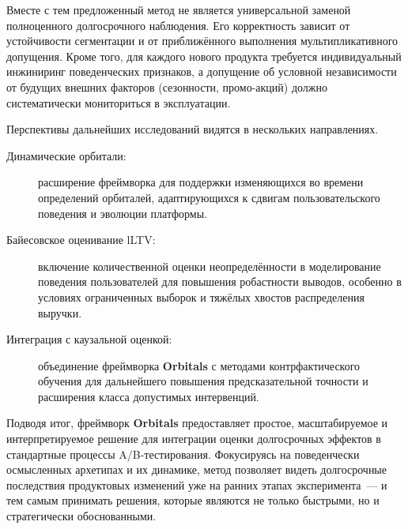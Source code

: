 Вместе с тем предложенный метод не является универсальной заменой
полноценного долгосрочного наблюдения. Его корректность зависит от
устойчивости сегментации и от приближённого выполнения
мультипликативного допущения. Кроме того, для каждого нового продукта
требуется индивидуальный инжиниринг поведенческих признаков, а
допущение об условной независимости от будущих внешних факторов
(сезонности, промо-акций) должно систематически мониториться в
эксплуатации.

Перспективы дальнейших исследований видятся в нескольких направлениях.

\begin{description}
    \item[Динамические орбитали:] расширение фреймворка для поддержки
          изменяющихся во времени определений орбиталей,
          адаптирующихся к сдвигам пользовательского поведения и
          эволюции платформы.

    \item[Байесовское оценивание lLTV:] включение количественной
          оценки неопределённости в моделирование поведения
          пользователей для повышения робастности выводов, особенно
          в условиях ограниченных выборок и тяжёлых хвостов
          распределения выручки.

    \item[Интеграция с каузальной оценкой:] объединение фреймворка
          \textbf{Orbitals} с методами контрфактического обучения для
          дальнейшего повышения предсказательной точности и
          расширения класса допустимых интервенций.
\end{description}

Подводя итог, фреймворк \textbf{Orbitals} предоставляет простое,
масштабируемое и интерпретируемое решение для интеграции оценки
долгосрочных эффектов в стандартные процессы A/B-тестирования.
Фокусируясь на поведенчески осмысленных архетипах и их динамике,
метод позволяет видеть долгосрочные последствия продуктовых изменений
уже на ранних этапах эксперимента~--- и тем самым принимать решения,
которые являются не только быстрыми, но и стратегически обоснованными.
